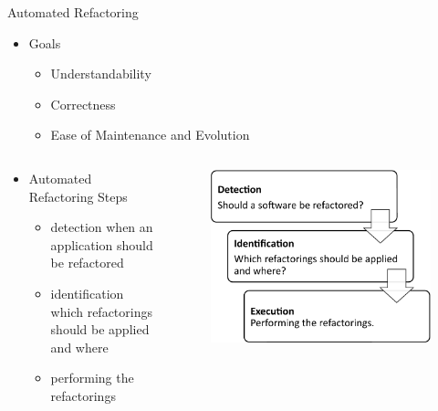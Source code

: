 \documentclass{beamer}
\begin{document}
\begin{frame}{Automated Refactoring}
	\begin{itemize}
		\item Goals
		\begin{itemize}
			\item Understandability
			\item Correctness
			\item Ease of Maintenance and Evolution
		\end{itemize}
	\end{itemize}
	\pause
	\begin{columns}[T]
		\begin{column}{.5\textwidth}
			\begin{itemize}
				\item Automated Refactoring Steps
				\begin{itemize}
					\item detection when an application should be refactored
					\item identification which refactorings should be applied and where
					\item performing the refactorings
				\end{itemize}
			\end{itemize}
		\end{column}
		\begin{column}{.5\textwidth}
			\begin{figure}[t]
				\centering
				\includegraphics[width=0.8\linewidth]{bilder/process}
			\end{figure}
		\end{column}
	\end{columns}	
\end{frame}
\end{document}
